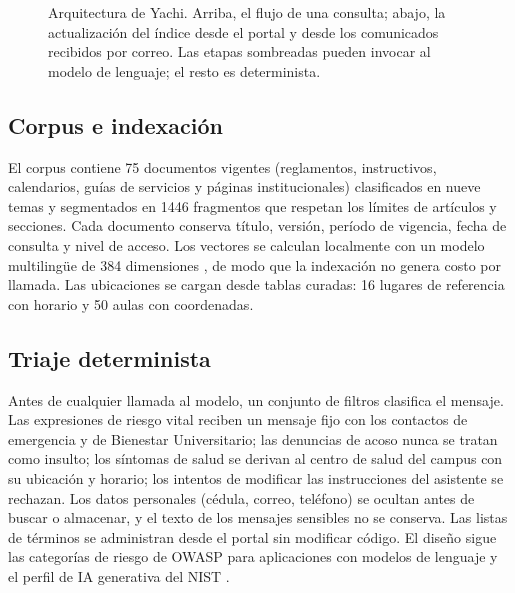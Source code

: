 \documentclass[conference]{IEEEtran}
\begin{document}
\begin{figure}[t]
{}
\caption{Arquitectura de Yachi. Arriba, el flujo de una consulta; abajo, la actualización del índice desde el portal y desde los comunicados recibidos por correo. Las etapas sombreadas pueden invocar al modelo de lenguaje; el resto es determinista.}
\label{fig:arch}
\end{figure}

\subsection{Corpus e indexación}
El corpus contiene 75 documentos vigentes (reglamentos, instructivos, calendarios, guías de servicios y páginas institucionales) clasificados en nueve temas y segmentados en \num{1446} fragmentos que respetan los límites de artículos y secciones. Cada documento conserva título, versión, período de vigencia, fecha de consulta y nivel de acceso. Los vectores se calculan localmente con un modelo multilingüe de 384 dimensiones \cite{reimers2020multilingual}, de modo que la indexación no genera costo por llamada. Las ubicaciones se cargan desde tablas curadas: 16 lugares de referencia con horario y 50 aulas con coordenadas.

\subsection{Triaje determinista}
Antes de cualquier llamada al modelo, un conjunto de filtros clasifica el mensaje. Las expresiones de riesgo vital reciben un mensaje fijo con los contactos de emergencia y de Bienestar Universitario; las denuncias de acoso nunca se tratan como insulto; los síntomas de salud se derivan al centro de salud del campus con su ubicación y horario; los intentos de modificar las instrucciones del asistente se rechazan. Los datos personales (cédula, correo, teléfono) se ocultan antes de buscar o almacenar, y el texto de los mensajes sensibles no se conserva. Las listas de términos se administran desde el portal sin modificar código. El diseño sigue las categorías de riesgo de OWASP para aplicaciones con modelos de lenguaje \cite{owasp2025} y el perfil de IA generativa del NIST \cite{nist2024}.
\end{document}
